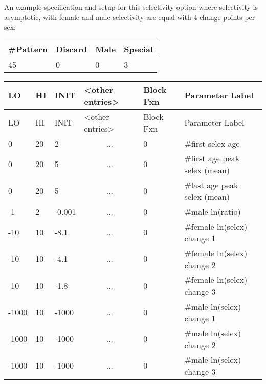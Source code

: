 An example specification and setup for this selectivity option where selectivity is asymptotic, with female and male selectivity are equal with 4 change points per sex:
	\begin{center}
		\begin{longtable}{p{1.5cm} p{1.5cm} p{1.5cm} p{1.5cm}}
			\hline
			\#Pattern & Discard & Male & Special \Tstrut\Bstrut\\
			\hline
			45 & 0 & 0 & 3 \Tstrut\Bstrut\\
			\hline
		\end{longtable}
	\end{center}
		

	\begin{longtable}{p{1cm} p{1cm} p{1cm} p{2.9cm} p{1.8cm} p{5.1cm}}
		\hline
		LO \Tstrut & HI & INIT & <other entries> & Block Fxn & Parameter Label \Bstrut\\
		\hline
		\endfirsthead
		
		\hline
		LO \Tstrut & HI & INIT & <other entries> & Block Fxn & Parameter Label \Bstrut\\
		\hline
		\endhead

		0     & 20 &  2     &  \multicolumn{1}{c}{...} & 0 & \#first selex age \Tstrut\\
		0     & 20 &  5     &  \multicolumn{1}{c}{...} & 0 & \#first age peak selex (mean) \\
		0     & 20 &  5     &  \multicolumn{1}{c}{...} & 0 & \#last age peak selex (mean) \\
		-1    &  2 & -0.001 &  \multicolumn{1}{c}{...} & 0 & \#male ln(ratio) \\
		-10   & 10 & -8.1   &  \multicolumn{1}{c}{...} & 0 & \#female ln(selex) change 1 \\
		-10   & 10 & -4.1   &  \multicolumn{1}{c}{...} & 0 & \#female ln(selex) change 2 \\
		-10   & 10 & -1.8   &  \multicolumn{1}{c}{...} & 0 & \#female ln(selex) change 3 \\
		-1000 & 10 & -1000  &  \multicolumn{1}{c}{...} & 0 & \#male ln(selex) change 1 \\
		-1000 & 10 & -1000  &  \multicolumn{1}{c}{...} & 0 & \#male ln(selex) change 2 \\
		-1000 & 10 & -1000  &  \multicolumn{1}{c}{...} & 0 & \#male ln(selex) change 3 \Bstrut\\
		\hline
	\end{longtable}

